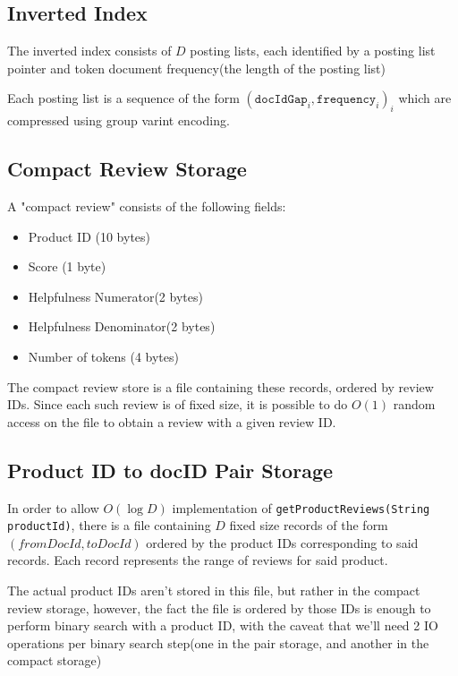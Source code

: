 \documentclass[11pt]{article}
\begin{document}
\subsection{Inverted Index}

The inverted index consists of $D$ posting lists, each identified by a posting list pointer
and token document frequency(the length of the posting list)

Each posting list is a sequence of the form $(\texttt{docIdGap}_i, \texttt{frequency}_i)_i$ which are compressed using group varint encoding.


\subsection{Compact Review Storage}
\label{sec:compactStorage}

A "compact review" consists of the following fields:

\begin{itemize}
	\item Product ID (10 bytes)
	\item Score (1 byte)
	\item Helpfulness Numerator(2 bytes)
	\item Helpfulness Denominator(2 bytes)
	\item Number of tokens (4 bytes)
\end{itemize}

The compact review store is a file containing these records, ordered by review IDs. Since
each such review is of fixed size, it is possible to do $O(1)$ random access on the file
to obtain a review with a given review ID. 

\subsection{Product ID to docID Pair Storage}
\label{sec:pairStorage}

In order to allow $O(\log D)$ implementation of \verb+getProductReviews(String productId)+, 
there is a file containing $D$ fixed size records of the form $(fromDocId, toDocId)$ ordered
by the product IDs corresponding to said records. Each record represents the range of reviews
for said product.

The actual product IDs aren't stored in this file, but rather in the compact review storage,
however, the fact the file is ordered by those IDs is enough to perform binary search with
a product ID, with the caveat that we'll need 2 IO operations per binary search step(one in the pair storage, and another in the compact storage)
\end{document}
